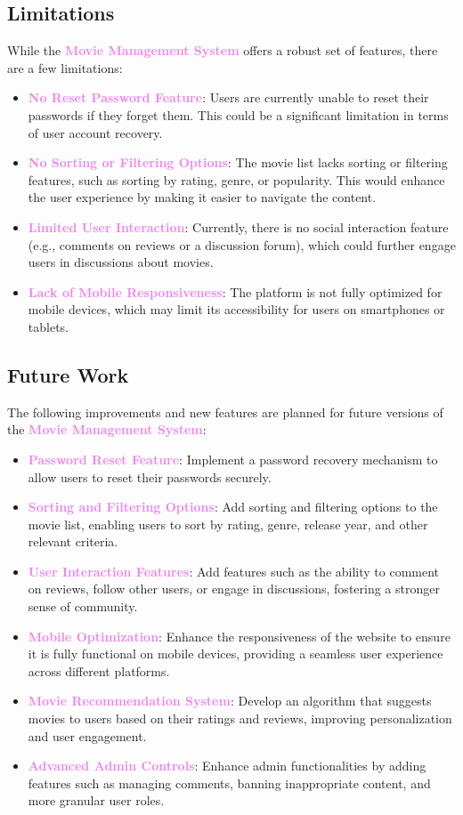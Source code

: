 \documentclass[a4paper,12pt]{article}  %
\renewcommand{\textbf}[1]{\textcolor{violet}{\bfseries #1}}
\begin{document}
\subsection{Limitations}
While the \textbf{Movie Management System} offers a robust set of features, there are a few limitations:
\begin{itemize}
    \item \textbf{No Reset Password Feature}: Users are currently unable to reset their passwords if they forget them. This could be a significant limitation in terms of user account recovery.
    \item \textbf{No Sorting or Filtering Options}: The movie list lacks sorting or filtering features, such as sorting by rating, genre, or popularity. This would enhance the user experience by making it easier to navigate the content.
    \item \textbf{Limited User Interaction}: Currently, there is no social interaction feature (e.g., comments on reviews or a discussion forum), which could further engage users in discussions about movies.
    \item \textbf{Lack of Mobile Responsiveness}: The platform is not fully optimized for mobile devices, which may limit its accessibility for users on smartphones or tablets.
\end{itemize}

\subsection{Future Work}
The following improvements and new features are planned for future versions of the \textbf{Movie Management System}:
\begin{itemize}
    \item \textbf{Password Reset Feature}: Implement a password recovery mechanism to allow users to reset their passwords securely.
    \item \textbf{Sorting and Filtering Options}: Add sorting and filtering options to the movie list, enabling users to sort by rating, genre, release year, and other relevant criteria.
    \item \textbf{User Interaction Features}: Add features such as the ability to comment on reviews, follow other users, or engage in discussions, fostering a stronger sense of community.
    \item \textbf{Mobile Optimization}: Enhance the responsiveness of the website to ensure it is fully functional on mobile devices, providing a seamless user experience across different platforms.
    \item \textbf{Movie Recommendation System}: Develop an algorithm that suggests movies to users based on their ratings and reviews, improving personalization and user engagement.
    \item \textbf{Advanced Admin Controls}: Enhance admin functionalities by adding features such as managing comments, banning inappropriate content, and more granular user roles.
\end{itemize}
\end{document}
